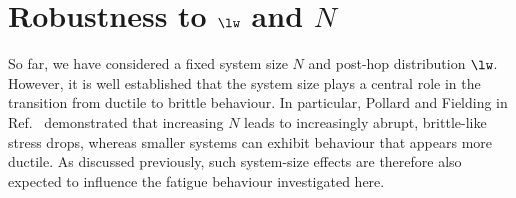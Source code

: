 \documentclass[asymmetricmargins]{library/duthesis}%
\begin{document}
\section{Robustness to \texorpdfstring{$\lw$ and $N$}{lw and N}} \label{sec:FatigueRobustness}

So far, we have considered a fixed system size $N$ and post-hop distribution $\lw$. However, it is well established that the system size plays a central role in the transition from ductile to brittle behaviour. In particular, Pollard and Fielding in Ref.~\cite{pollard_yielding_2022} demonstrated that increasing $N$ leads to increasingly abrupt, brittle-like stress drops, whereas smaller systems can exhibit behaviour that appears more ductile. As discussed previously, such system-size effects are therefore also expected to influence the fatigue behaviour investigated here.
\end{document}
